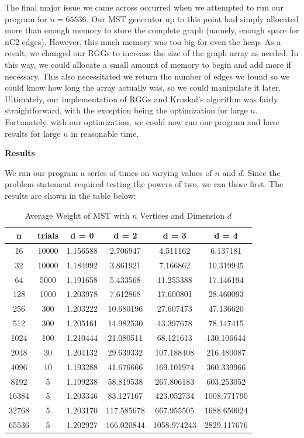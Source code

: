 \documentclass[12pt]{article}
\begin{document}
The final major issue we came across occurred when we attempted to run our program for $n = 65536$. Our MST generator up to this point had simply allocated more than enough memory to store the complete graph (namely, enough space for nC2 edges). However, this much memory was too big for even the heap. As a result, we changed our RGGs to increase the size of the graph array as needed. In this way, we could allocate a small amount of memory to begin and add more if necessary. This also necessitated we return the number of edges we found so we could know how long the array actually was, so we could manipulate it later. \\

Ultimately, our implementation of RGGs and Kruskal's algorithm was fairly straightforward, with the exception being the optimization for large $n$. Fortunately, with our optimization, we could now run our program and have results for large $n$ in reasonable time. \\

\bigskip

\pagebreak

\textbf{Results}

We ran our program a series of times on varying values of $n$ and $d$. Since the problem statement required testing the powers of two, we ran those first. The results are shown in the table below: \\

\begin{table}[h!]
\centering
\caption{Average Weight of MST with $n$ Vertices and Dimension $d$}
\begin{tabular} {c | c | c | c | c | c  }
n&trials&d = 0&d = 2&d = 3&d = 4\\ \hline
16&10000&1.156588&2.706947&4.511162&6.137181\\
32&10000&1.184992&3.861921&7.166862&10.319945\\
64&5000&1.191658&5.433568&11.255388&17.146194\\
128&1000&1.203978&7.612868&17.600801&28.460093\\
256&300&1.203222&10.680196&27.607473&47.136620\\
512&300&1.205161&14.982530&43.397678&78.147415\\
1024&100&1.210444&21.080511&68.121613&130.106644\\
2048&30&1.204132&29.639332&107.188408&216.480087\\
4096&10&1.193288&41.676666&169.101974&360.339966\\
8192&5&1.199238&58.819538&267.806183&603.253052\\
16384&5&1.203346&83.127167&423.052734&1008.771790\\
32768&5&1.203170&117.585678&667.955505&1688.650024\\
65536&5&1.202927&166.020844&1058.974243&2829.117676\\
\end{tabular}
\label{table:1}
\end{table}
\end{document}
